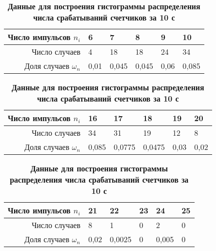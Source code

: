 \documentclass[a4paper, 10pt]{article}%
\begin{document}
\begin{table}
\caption{\textbf{Данные для построения гистограммы распределения числа срабатываний счетчиков за 10 с}}
\begin{tabular}{|r|p{1cm}|p{1cm}|p{1cm}|p{1cm}|p{1cm}|}
\hline
Число импульсов $n_i$&6&7&8&9&10\\
\hline
Число случаев&4&18&18&24&34\\
\hline
Доля случаев $\omega_n$&0,01&0,045&0,045&0,06&0,085\\
\hline
\end{tabular}
\begin{tabular}{|r|p{1cm}|p{1cm}|p{1cm}|p{1cm}|p{1cm}|}
\hline
Число импульсов $n_i$&16&17&18&19&20\\
\hline
Число случаев&34&31&19&12&8\\
\hline
Доля случаев $\omega_n$&0,085&0,0775&0,0475&0,03&0,02\\
\hline
\end{tabular}
\begin{tabular}{|r|p{1cm}|p{1cm}|p{1cm}|p{1cm}|p{1cm}|}
\hline
Число импульсов $n_i$&21&22&23&24&25\\
\hline
Число случаев&8&1&0&2&0\\
\hline
Доля случаев $\omega_n$&0,02&0,0025&0&0,005&0\\
\hline
\end{tabular}
\end{table}
\end{document}

